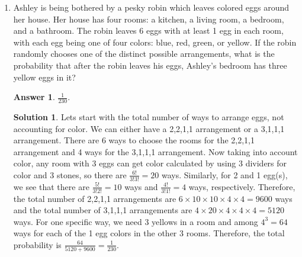 \documentclass[11pt]{article}
\theoremstyle{definition}
\newtheorem*{solution}{Solution}
\newtheorem*{answer}{Answer}
\begin{document}
\begin{enumerate}
\item Ashley is being bothered by a pesky robin which leaves colored eggs around her house. Her house has four rooms: a kitchen, a living room, a bedroom, and a bathroom. The robin leaves 6 eggs with at least 1 egg in each room, with each egg being one of four colors: blue, red, green, or yellow. If the robin randomly chooses one of the distinct possible arrangements, what is the probability that after the robin leaves his eggs, Ashley's bedroom has three yellow eggs in it?

\begin{answer}
$\frac{1}{230}$.
\end{answer}
\begin{solution}

Lets start with the total number of ways to arrange eggs, not accounting for color. We can either have a 2,2,1,1 arrangement or a 3,1,1,1 arrangement. There are 6 ways to choose the rooms for the 2,2,1,1 arrangement and 4 ways for the 3,1,1,1 arrangement. Now taking into account color, any room with 3 eggs can get color calculated by using 3 dividers for color and 3 stones, so there are $\frac{6!}{3!3!} = 20$ ways. Similarly, for 2 and 1 egg(s), we see that there are $\frac{5!}{3!2!} = 10$ ways and $\frac{4!}{3!1!} = 4$ ways, respectively. Therefore, the total number of 2,2,1,1 arrangements are $6 \times 10 \times 10 \times 4 \times 4 = 9600$ ways and the total number of 3,1,1,1 arrangements are $4 \times 20 \times 4 \times 4 \times 4 = 5120$ ways. For one specific way, we need 3 yellows in a room and among $4^3 = 64$ ways for each of the 1 egg colors in the other 3 rooms. Therefore, the total probability is $\frac{64}{5120+9600} = \boxed{\frac{1}{230}}$.

\end{solution}

\end{enumerate}


\eject
\end{document}
